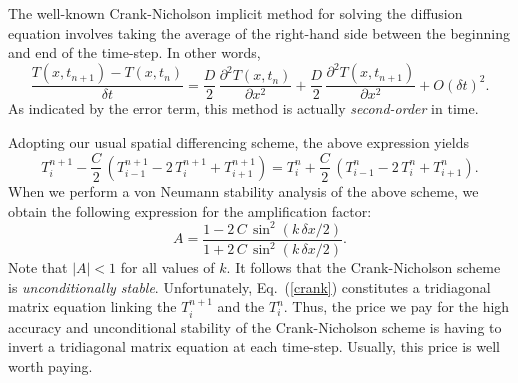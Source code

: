 The well-known Crank-Nicholson implicit method for solving the diffusion equation involves
taking the 
average of the right-hand side between the beginning and  end of  the time-step. In other words,
\begin{equation}
\frac{T(x,t_{n+1}) - T(x,t_n)}{\delta t} 
= \frac{D}{2} \,\frac{\partial^2 T(x,t_n)}{\partial x^2}+
\frac{D}{2} \,\frac{\partial^2 T(x,t_{n+1})}{\partial x^2}+ O(\delta t)^2.
\end{equation}
As indicated by the error term, this method is actually {\em second-order} in time.

Adopting our usual spatial differencing scheme, the above expression yields
\begin{equation}\label{crank}
T_i^{n+1} - \frac{C}{2}\,\left(T_{i-1}^{n+1}-2\,T_i^{n+1}+T_{i+1}^{n+1}\right)=
 T_i^n + \frac{C}{2}\,\left(T_{i-1}^n-2\,T_i^n+T_{i+1}^n\right).
\end{equation}
When we perform a von Neumann stability analysis of the above scheme, we obtain the
following expression for the amplification factor:
\begin{equation}
A = \frac{1 - 2\,C\,\sin^2(k\,\delta x/2)}{1+2\,C\,\sin^2(k\,\delta x/2)}.
\end{equation}
Note that $|A|<1$ for all values of $k$. It follows that the Crank-Nicholson
scheme is {\em unconditionally stable}. Unfortunately, Eq.~(\ref{crank}) constitutes
a tridiagonal matrix equation linking the $T_i^{n+1}$ and the $T_i^n$. Thus, the
price we pay for the high accuracy and unconditional stability of the Crank-Nicholson
scheme is  having to invert a tridiagonal matrix equation at each time-step. Usually,
this price is well worth paying.

